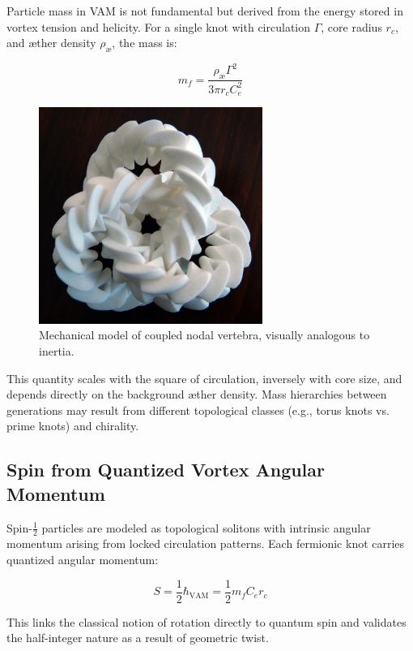 Particle mass in VAM is not fundamental but derived from the energy stored in vortex tension and helicity. For a single knot with circulation $\Gamma$, core radius $r_c$, and æther density $\rho_{\text{\ae}}$, the mass is:

\begin{equation}
m_f = \frac{\rho_{\text{\ae}} \Gamma^2}{3\pi r_c C_e^2}
\end{equation}

\begin{figure}[h!]
\centering
\includegraphics[width=0.65\textwidth]{mechanic trefoil}
\caption{Mechanical model of coupled nodal vertebra, visually analogous to inertia.}
\end{figure}

This quantity scales with the square of circulation, inversely with core size, and depends directly on the background æther density. Mass hierarchies between generations may result from different topological classes (e.g., torus knots vs. prime knots) and chirality.

\subsection{Spin from Quantized Vortex Angular Momentum}

Spin-$\tfrac{1}{2}$ particles are modeled as topological solitons with intrinsic angular momentum arising from locked circulation patterns. Each fermionic knot carries quantized angular momentum:

\begin{equation}
S = \frac{1}{2} \hbar_\text{VAM} = \frac{1}{2} m_f C_e r_c
\end{equation}

This links the classical notion of rotation directly to quantum spin and validates the half-integer nature as a result of geometric twist.

